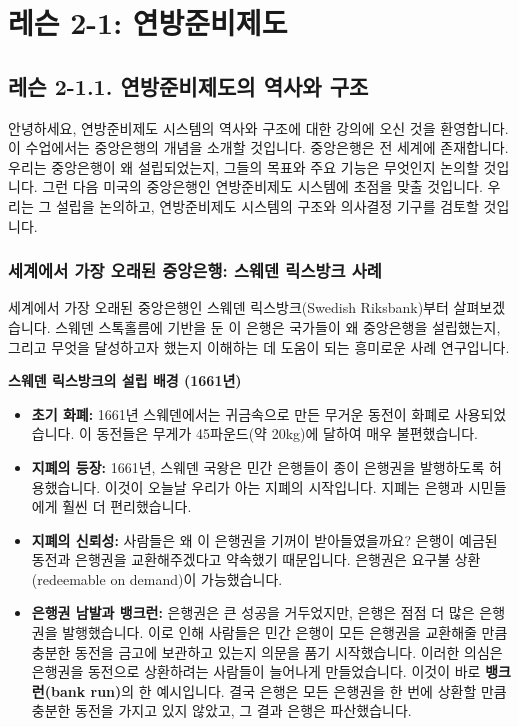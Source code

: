\documentclass[11pt,a4paper]{article}
\begin{document}
\newpage
\section{레슨 2-1: 연방준비제도}

\subsection{레슨 2-1.1. 연방준비제도의 역사와 구조}

안녕하세요, 연방준비제도 시스템의 역사와 구조에 대한 강의에 오신 것을 환영합니다. 이 수업에서는 중앙은행의 개념을 소개할 것입니다. 중앙은행은 전 세계에 존재합니다. 우리는 중앙은행이 왜 설립되었는지, 그들의 목표와 주요 기능은 무엇인지 논의할 것입니다. 그런 다음 미국의 중앙은행인 연방준비제도 시스템에 초점을 맞출 것입니다. 우리는 그 설립을 논의하고, 연방준비제도 시스템의 구조와 의사결정 기구를 검토할 것입니다.

\vspace{1em}

\subsubsection*{세계에서 가장 오래된 중앙은행: 스웨덴 릭스방크 사례}
세계에서 가장 오래된 중앙은행인 스웨덴 릭스방크(Swedish Riksbank)부터 살펴보겠습니다. 스웨덴 스톡홀름에 기반을 둔 이 은행은 국가들이 왜 중앙은행을 설립했는지, 그리고 무엇을 달성하고자 했는지 이해하는 데 도움이 되는 흥미로운 사례 연구입니다.

\begin{examplebox}
\textbf{스웨덴 릭스방크의 설립 배경 (1661년)}
\begin{itemize}
    \item \textbf{초기 화폐:} 1661년 스웨덴에서는 귀금속으로 만든 무거운 동전이 화폐로 사용되었습니다. 이 동전들은 무게가 45파운드(약 20kg)에 달하여 매우 불편했습니다.
    \item \textbf{지폐의 등장:} 1661년, 스웨덴 국왕은 민간 은행들이 종이 은행권을 발행하도록 허용했습니다. 이것이 오늘날 우리가 아는 지폐의 시작입니다. 지폐는 은행과 시민들에게 훨씬 더 편리했습니다.
    \item \textbf{지폐의 신뢰성:} 사람들은 왜 이 은행권을 기꺼이 받아들였을까요? 은행이 예금된 동전과 은행권을 교환해주겠다고 약속했기 때문입니다. 은행권은 요구불 상환(redeemable on demand)이 가능했습니다.
    \item \textbf{은행권 남발과 뱅크런:} 은행권은 큰 성공을 거두었지만, 은행은 점점 더 많은 은행권을 발행했습니다. 이로 인해 사람들은 민간 은행이 모든 은행권을 교환해줄 만큼 충분한 동전을 금고에 보관하고 있는지 의문을 품기 시작했습니다. 이러한 의심은 은행권을 동전으로 상환하려는 사람들이 늘어나게 만들었습니다. 이것이 바로 \textbf{뱅크런(bank run)}의 한 예시입니다. 결국 은행은 모든 은행권을 한 번에 상환할 만큼 충분한 동전을 가지고 있지 않았고, 그 결과 은행은 파산했습니다.
\end{itemize}
\end{examplebox}
\end{document}
